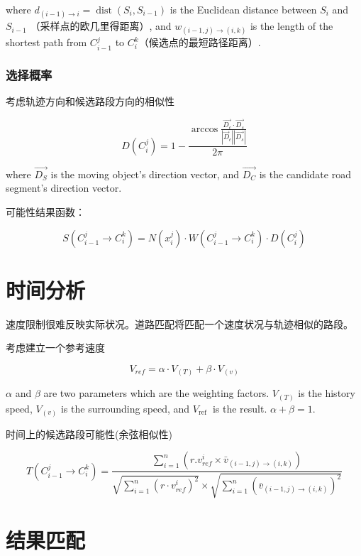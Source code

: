 where $ d_{(i-1) \rightarrow i}=\operatorname{dist}\left(S_{i}, S_{i-1}\right) $ is the Euclidean distance between $ S_{i} $ and $ S_{i-1} $ （采样点的欧几里得距离）, and $ w_{(i-1, j) \longrightarrow(i, k)} $ is the length of the shortest path from $ C_{i-1}^{j} $ to $ C_{i}^{k} $（候选点的最短路径距离）.

\subsubsection{选择概率}

考虑轨迹方向和候选路段方向的相似性

$$ D\left(C_{i}^{j}\right)=1-\frac{\arccos \frac{\overrightarrow{D_{c}} \cdot \overrightarrow{D_{s}}}{\left|\vec{D}_{c}\right|\left|\overrightarrow{{D}_{s}}\right|}}{2 \pi} $$

where $ \overrightarrow{D_{S}} $ is the moving object's direction vector, and $ \overrightarrow{D_{C}} $ is the candidate road segment's direction vector.

可能性结果函数：

$$ S\left(C_{i-1}^{j} \rightarrow C_{i}^{k}\right)=N\left(x_{i}^{j}\right) \cdot W\left(C_{i-1}^{j} \rightarrow C_{i}^{k}\right) \cdot D\left(C_{i}^{j}\right) $$

\section{时间分析}

速度限制很难反映实际状况。道路匹配将匹配一个速度状况与轨迹相似的路段。

考虑建立一个参考速度

$$ V_{r e f}=\alpha \cdot V_{(T)}+\beta \cdot V_{(v)} $$

$ \alpha $ and $ \beta $ are two parameters which are the weighting factors. $ V_{(T)} $ is the history speed, $ V_{(v)} $ is the surrounding speed, and $ V_{\text {ref }} $ is the result. $\alpha + \beta = 1$.

时间上的候选路段可能性(余弦相似性)

$$ T\left(C_{i-1}^{j} \rightarrow C_{i}^{k}\right)=\frac{\sum_{i=1}^{n}\left(r . v_{r e f}^{i} \times \bar{v}_{(i-1, j) \rightarrow(i, k)}\right)}{\sqrt{\sum_{i=1}^{n}\left(r \cdot v_{r e f}^{i}\right)^{2}} \times \sqrt{\sum_{i=1}^{n}\left(\bar{v}_{(i-1, j) \rightarrow(i, k)}\right)^{2}}} $$

\section{结果匹配}

